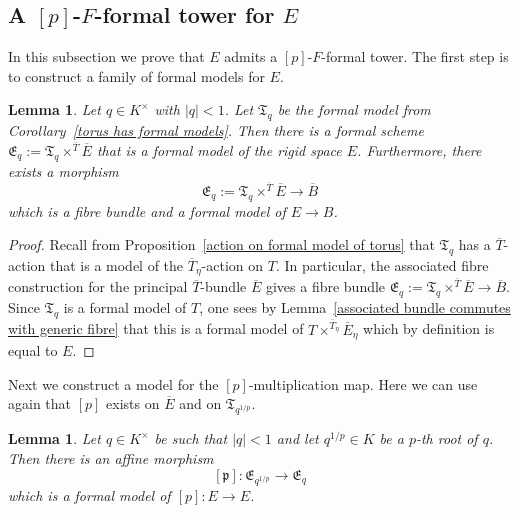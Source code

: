 \documentclass[10pt,oneside]{amsart}
\newtheorem{lemma}[theorem]{Lemma}
\theoremstyle{definition}
\begin{document}
 
	
	\subsection{A $[p]$-$F$-formal tower for $E$}
	In this subsection we prove that $E$ admits a $[p]$-$F$-formal tower. The first step is to construct a family of formal models for $E$. %
	\begin{lemma}
	Let $q\in K^\times$ with $|q|<1$. Let $\mathfrak T_q$ be the formal model from Corollary~\ref{torus has formal models}. Then there is a formal scheme $\mathfrak E_q :=\mathfrak T_q \times^{\overline{T}}\overline{E}$ that is a formal model of the rigid space $E$. Furthermore, there exists a morphism
	\[\mathfrak E_q :=\mathfrak T_q \times^{\overline{T}} \overline{E} \rightarrow \overline{B} \]
	which is a fibre bundle and a formal model of $E\rightarrow B$.
	\end{lemma}
	\begin{proof}
		Recall from Proposition~\ref{action on formal model of torus} that $\mathfrak T_q$ has a $\overline{T}$-action that is a model of the $\overline{T}_\eta$-action on $T$. In particular, the associated fibre construction for the principal $\overline{T}$-bundle $\overline{E}$ gives a fibre bundle $\mathfrak E_q :=\mathfrak T_q \times^{\overline{T}} \overline{E} \rightarrow \overline{B}$. Since $\mathfrak T_q$ is a formal model of $T$, one sees by Lemma~\ref{associated bundle commutes with generic fibre} that this is a formal model of $T\times^{\overline{T}_\eta}\overline{E}_\eta$ which by definition is equal to $E$.
	\end{proof}
	
	Next we construct a model for the $[p]$-multiplication map. Here we can use again that $[p]$ exists on $\overline{E}$ and on $\mathfrak T_{q^{1/p}}$.
	\begin{lemma}\label{formal model of p-multiplication on E}
		Let $q\in K^\times$ be such that $|q|<1$ and let $q^{1/p}\in K$ be a $p$-th root of $q$. Then there is an affine morphism
		\[[\mathfrak p]:\mathfrak E_{q^{1/p}} \rightarrow  \mathfrak E_{q}\]
		which is a formal model of $[p]:E\rightarrow E$.
	\end{lemma}
		
\end{document}
